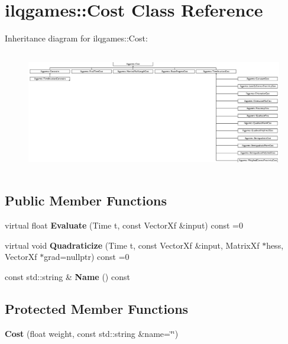 \hypertarget{classilqgames_1_1_cost}{}\section{ilqgames\+:\+:Cost Class Reference}
\label{classilqgames_1_1_cost}
Inheritance diagram for ilqgames\+:\+:Cost\+:\begin{figure}[H]
\begin{center}
\leavevmode
\includegraphics[height=5.333333cm]{classilqgames_1_1_cost}
\end{center}
\end{figure}
\subsection*{Public Member Functions}
\begin{DoxyCompactItemize}
\item 
virtual float {\bfseries Evaluate} (Time t, const Vector\+Xf \&input) const =0\hypertarget{classilqgames_1_1_cost_a90ad7fc2697f0d8c3392dc5a079e40f9}{}\label{classilqgames_1_1_cost_a90ad7fc2697f0d8c3392dc5a079e40f9}

\item 
virtual void {\bfseries Quadraticize} (Time t, const Vector\+Xf \&input, Matrix\+Xf $\ast$hess, Vector\+Xf $\ast$grad=nullptr) const =0\hypertarget{classilqgames_1_1_cost_ade89b117df8b8ec0e491d121f9682aef}{}\label{classilqgames_1_1_cost_ade89b117df8b8ec0e491d121f9682aef}

\item 
const std\+::string \& {\bfseries Name} () const \hypertarget{classilqgames_1_1_cost_a7e21af3d7f23aee0d913ad5e2e0292cb}{}\label{classilqgames_1_1_cost_a7e21af3d7f23aee0d913ad5e2e0292cb}

\end{DoxyCompactItemize}
\subsection*{Protected Member Functions}
\begin{DoxyCompactItemize}
\item 
{\bfseries Cost} (float weight, const std\+::string \&name=\char`\"{}\char`\"{})\hypertarget{classilqgames_1_1_cost_a9b30ac1d7733741609a3c8d6522a925b}{}\label{classilqgames_1_1_cost_a9b30ac1d7733741609a3c8d6522a925b}

\end{DoxyCompactItemize}
